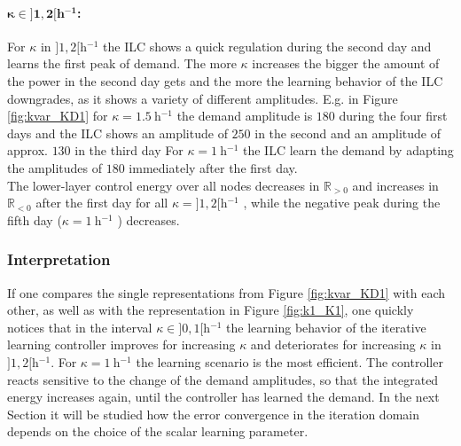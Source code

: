 \paragraph{$\boldsymbol{\kappa \in ]1,2[\si{\hour^{-1}}}$:}
For $\kappa$ in $]1,2[\si{\hour^{-1}}$  the ILC shows a quick regulation during the second day and learns the first peak of demand. The more $\kappa$ increases the bigger the amount of the power in the second day gets and the more the learning behavior of the ILC downgrades, as it shows a variety of different amplitudes. E.g. in Figure \ref{fig:kvar_KD1} for $\kappa = \SI{1.5}{\hour^{-1}}$  the demand amplitude is $180$ during the four first days and the ILC shows an amplitude of $250$ in the second and an amplitude of approx. $130$ in the third day  For $\kappa = \SI{1}{\hour^{-1}}$  the ILC learn the demand by adapting the amplitudes of $180$ immediately after the first day. 
\\The lower-layer control energy over all nodes decreases in $\mathbb{R}_{>0}$ and increases in $\mathbb{R}_{<0}$ after the first day for all $\kappa = ]1,2[\si{\hour^{-1}}$ , while the negative peak during the fifth day ($\kappa = \SI{1}{\hour^{-1}}$ ) decreases.

\subsubsection*{Interpretation}
If one compares the single representations from Figure \ref{fig:kvar_KD1} with each other, as well as with the representation in Figure \ref{fig:k1_K1}, one quickly notices that in the interval $\kappa \in ]0,1[\si{\hour^{-1}}$ the learning behavior of the iterative learning controller improves for increasing $\kappa$ and deteriorates for increasing $\kappa$ in $]1,2[\si{\hour^{-1}}$. For $\kappa = \SI{1}{\hour^{-1}}$ the learning scenario is the most efficient. The controller reacts sensitive to the change of the demand amplitudes, so that the integrated energy increases again, until the controller has learned the demand. In the next Section it will be studied how the error convergence in the iteration domain depends on the choice of the scalar learning parameter.

